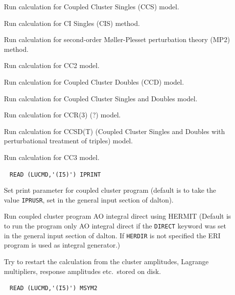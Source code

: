 \begin{description}
\item[] 
        Run calculation for Coupled Cluster Singles (CCS) model. 
%
%
%
\item[]    
        Run calculation for CI Singles (CIS) method. 
%
\item[]    
        Run calculation for second-order M{\o}ller-Plesset 
        perturbation theory (MP2) method. 
%
\item[]    
        Run calculation for CC2 model. 
%
%
\item[]    
        Run calculation for Coupled Cluster Doubles (CCD) model. 
%
\item[]   
        Run calculation for Coupled Cluster Singles and Doubles model.
%
%
%

\item[] 
        Run calculation for CCR(3) (?) model.
%
%
\item[]  
        Run calculation for CCSD(T) (Coupled Cluster Singles and 
        Doubles with perturbational treatment of triples) model.
%
\item[]     
        Run calculation for CC3 model.
%
\item[]  \verb| |\newline
\verb|READ (LUCMD,'(I5)') IPRINT|

       Set print parameter for coupled cluster program
       (default is to take the value \verb+IPRUSR+, set in the general
       input section of dalton).
%
\item[] 
       Run coupled cluster program AO integral direct using HERMIT
       (Default is to run the program only AO integral direct
       if the \verb+DIRECT+ keyword was set in the general
       input section of dalton. If \verb+HERDIR+ is not specified the ERI
       program is used as integral generator.) 
%
\item[] 
       Try to restart the calculation from the cluster amplitudes,
       Lagrange multipliers, response amplitudes etc.\ stored on
       disk.
%
\item[] \verb| |\newline
       \verb|READ (LUCMD,'(I5)') MSYM2|


\end{description}
